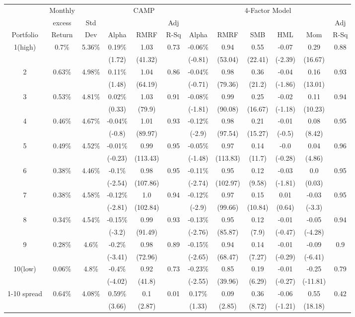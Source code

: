 \documentclass[a4paper]{article}
\begin{document}
    \begin{table}[h!]
        \centering
        \begin{tabular}{c cc ccc cccccc} 
        \toprule[1.5pt]
          &  Monthly &  & \multicolumn{3}{c}{CAMP} &  \multicolumn{6}{c}{4-Factor Model}\\
          & excess& Std &   &  & Adj &   &  &  &  &  & Adj\\
         Portfolio & Return & Dev & Alpha  & RMRF & R-Sq &  Alpha  & RMRF & SMB & HML & Mom &  R-Sq\\
        
        \toprule[1.5pt]
        1(high)&0.7\%&5.36\%&0.19\%&1.03&0.73&-0.06\%&0.94&0.55&-0.07&0.29&0.88\\
        &&&(1.72)&(41.32)&&(-0.81)&(53.04)&(22.41)&(-2.39)&(16.67)&\\
        2&0.63\%&4.98\%&0.11\%&1.04&0.86&-0.04\%&0.98&0.36&-0.04&0.16&0.93\\
        &&&(1.48)&(64.19)&&(-0.71)&(79.36)&(21.2)&(-1.86)&(13.01)&\\
        3&0.53\%&4.81\%&0.02\%&1.03&0.91&-0.08\%&0.99&0.25&-0.02&0.11&0.94\\
        &&&(0.33)&(79.9)&&(-1.81)&(90.08)&(16.67)&(-1.18)&(10.23)&\\
        4&0.46\%&4.67\%&-0.04\%&1.01&0.93&-0.12\%&0.98&0.21&-0.01&0.08&0.95\\
        &&&(-0.8)&(89.97)&&(-2.9)&(97.54)&(15.27)&(-0.5)&(8.42)&\\
        5&0.49\%&4.52\%&-0.01\%&0.99&0.95&-0.05\%&0.97&0.14&-0.0&0.04&0.96\\
        &&&(-0.23)&(113.43)&&(-1.48)&(113.83)&(11.7)&(-0.28)&(4.86)&\\
        6&0.38\%&4.46\%&-0.1\%&0.98&0.95&-0.11\%&0.95&0.12&-0.03&0.0&0.95\\
        &&&(-2.54)&(107.86)&&(-2.74)&(102.97)&(9.58)&(-1.81)&(0.03)&\\
        7&0.38\%&4.58\%&-0.12\%&1.0&0.94&-0.12\%&0.97&0.15&0.01&-0.03&0.95\\
        &&&(-2.81)&(102.84)&&(-2.9)&(99.66)&(10.84)&(0.64)&(-3.3)&\\
        8&0.34\%&4.54\%&-0.15\%&0.99&0.93&-0.13\%&0.95&0.12&-0.01&-0.05&0.94\\
        &&&(-3.2)&(91.49)&&(-2.76)&(85.87)&(7.9)&(-0.47)&(-4.28)&\\
        9&0.28\%&4.6\%&-0.2\%&0.98&0.89&-0.15\%&0.94&0.14&-0.01&-0.09&0.9\\
        &&&(-3.41)&(72.96)&&(-2.65)&(68.47)&(7.27)&(-0.29)&(-6.41)&\\
        10(low)&0.06\%&4.8\%&-0.4\%&0.92&0.73&-0.23\%&0.85&0.19&-0.01&-0.25&0.79\\
        &&&(-4.02)&(41.8)&&(-2.55)&(39.96)&(6.29)&(-0.27)&(-11.81)&\\
        1-10 spread&0.64\%&4.08\%&0.59\%&0.1&0.01&0.17\%&0.09&0.36&-0.06&0.55&0.42\\
        &&&(3.66)&(2.87)&&(1.33)&(2.85)&(8.72)&(-1.21)&(18.18)&\\
        

\end{tabular}
\end{table}
\end{document}
